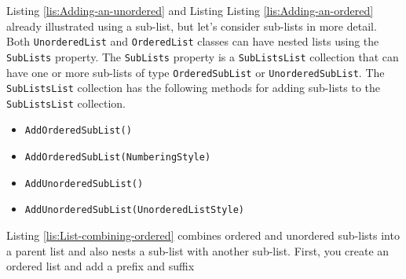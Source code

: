 \documentclass[american,letterpaper]{tufte-book}
\numberwithin{equation}{section}
\numberwithin{figure}{section}
\begin{document}
Listing \ref{lis:Adding-an-unordered} and Listing Listing \ref{lis:Adding-an-ordered}
already illustrated using a sub-list, but let's consider sub-lists
in more detail. Both \texttt{UnorderedList} and \texttt{OrderedList}
classes can have nested lists using the \texttt{SubLists} property.
The \texttt{SubLists} property is a \texttt{SubListsList} collection
that can have one or more sub-lists of type \texttt{OrderedSubList}
or \texttt{UnorderedSubList}. The \texttt{SubListsList} collection
has the following methods for adding sub-lists to the \texttt{SubListsList}
collection.
\begin{itemize}
\item \texttt{AddOrderedSubList()}
\item \texttt{AddOrderedSubList(NumberingStyle)}
\item \texttt{AddUnorderedSubList()}
\item \texttt{AddUnorderedSubList(UnorderedListStyle)}
\end{itemize}
Listing \ref{lis:List-combining-ordered} combines ordered and unordered
sub-lists into a parent list and also nests a sub-list with another
sub-list. First, you create an ordered list and add a prefix and suffix
\end{document}
